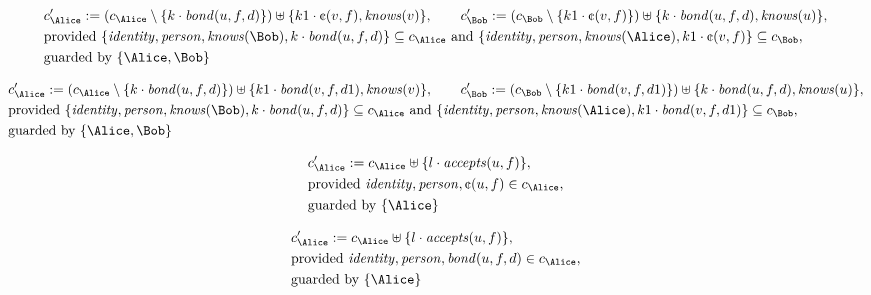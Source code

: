 \begin{align*}
&
c'_
{
\Alice
}
 := 
(c_
{
\Alice
}
 \setminus 
\{
k
\cdot
\mathit{
bond
}
(
u
,
f
,
d
)
\}
) \uplus 
\{
k1
\cdot
\text{\textcent}
(
v
,
f
)
,
\mathit{
knows
}
(
v
)
\}
, \qquad 
c'_
{
\Bob
}
 := 
(c_
{
\Bob
}
 \setminus 
\{
k1
\cdot
\text{\textcent}
(
v
,
f
)
\}
) \uplus 
\{
k
\cdot
\mathit{
bond
}
(
u
,
f
,
d
)
,
\mathit{
knows
}
(
u
)
\}
,\\
&
\text{provided } 
\{
\mathit{
identity
}
,
\mathit{
person
}
,
\mathit{
knows
}
(
\Bob
)
,
k
\cdot
\mathit{
bond
}
(
u
,
f
,
d
)
\}
 \subseteq c_
{
\Alice
}
 \text{ and } 
\{
\mathit{
identity
}
,
\mathit{
person
}
,
\mathit{
knows
}
(
\Alice
)
,
k1
\cdot
\text{\textcent}
(
v
,
f
)
\}
 \subseteq c_
{
\Bob
}
,\\
&
\text{guarded by } \{
\Alice
,
\Bob
\}
\end{align*}

\begin{align*}
&
c'_
{
\Alice
}
 := 
(c_
{
\Alice
}
 \setminus 
\{
k
\cdot
\mathit{
bond
}
(
u
,
f
,
d
)
\}
) \uplus 
\{
k1
\cdot
\mathit{
bond
}
(
v
,
f
,
d1
)
,
\mathit{
knows
}
(
v
)
\}
, \qquad 
c'_
{
\Bob
}
 := 
(c_
{
\Bob
}
 \setminus 
\{
k1
\cdot
\mathit{
bond
}
(
v
,
f
,
d1
)
\}
) \uplus 
\{
k
\cdot
\mathit{
bond
}
(
u
,
f
,
d
)
,
\mathit{
knows
}
(
u
)
\}
,\\
&
\text{provided } 
\{
\mathit{
identity
}
,
\mathit{
person
}
,
\mathit{
knows
}
(
\Bob
)
,
k
\cdot
\mathit{
bond
}
(
u
,
f
,
d
)
\}
 \subseteq c_
{
\Alice
}
 \text{ and } 
\{
\mathit{
identity
}
,
\mathit{
person
}
,
\mathit{
knows
}
(
\Alice
)
,
k1
\cdot
\mathit{
bond
}
(
v
,
f
,
d1
)
\}
 \subseteq c_
{
\Bob
}
,\\
&
\text{guarded by } \{
\Alice
,
\Bob
\}
\end{align*}

\begin{align*}
&
c'_
{
\Alice
}
 := 
c_
{
\Alice
}
 \uplus 
\{
l
\cdot
\mathit{
accepts
}
(
u
,
f
)
\}
,\\
&
\text{provided } 
\mathit{
identity
}
,
\mathit{
person
}
,
\text{\textcent}
(
u
,
f
)
 \in c_
{
\Alice
}
,\\
&
\text{guarded by } \{
\Alice
\}
\end{align*}

\begin{align*}
&
c'_
{
\Alice
}
 := 
c_
{
\Alice
}
 \uplus 
\{
l
\cdot
\mathit{
accepts
}
(
u
,
f
)
\}
,\\
&
\text{provided } 
\mathit{
identity
}
,
\mathit{
person
}
,
\mathit{
bond
}
(
u
,
f
,
d
)
 \in c_
{
\Alice
}
,\\
&
\text{guarded by } \{
\Alice
\}
\end{align*}
